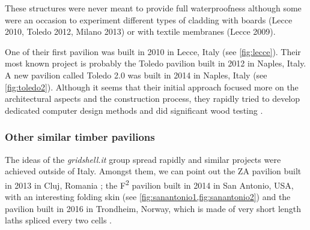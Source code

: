 These structures were never meant to provide full waterproofness although some were an occasion to experiment different types of cladding with boards (Lecce 2010, Toledo 2012, Milano 2013) or with textile membranes (Lecce 2009).

One of their first pavilion was built in 2010 in Lecce, Italy (see \cref{fig:lecce}). Their most known project is probably the Toledo pavilion built in 2012 in Naples, Italy.  A new pavilion called Toledo 2.0 was built in 2014 in Naples, Italy (see \cref{fig:toledo2}). Although it seems that their initial approach focused more on the architectural aspects and the construction process, they rapidly tried to develop dedicated computer design methods \cite{DAmico2014} and did significant wood testing \cite{DAmico2015a}.

\subsubsection{Other similar timber pavilions}
The ideas of the \emph{gridshell.it} group spread rapidly and similar projects were achieved outside of Italy. Amongst them, we can point out the ZA pavilion built in 2013 in Cluj, Romania \cite{Naicu2014}; the F\textsuperscript{2} pavilion built in 2014 in San Antonio, USA, with an interesting folding skin (see \cref{fig:sanantonio1,fig:sanantonio2}) and the pavilion built in 2016 in Trondheim, Norway, which is made of very short length laths spliced every two cells \cite{Mork2016,Labonnote2016}.




